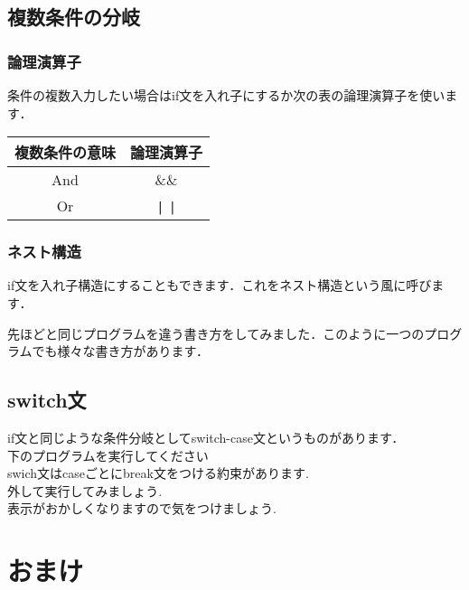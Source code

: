 \documentclass[a4j,titlepage,dvipdfmx]{jsarticle}   %
\begin{document}
\subsection{複数条件の分岐}
\subsubsection{論理演算子}
条件の複数入力したい場合はif文を入れ子にするか次の表の論理演算子を使います．
\begin{table}[htb]
\begin{tabular}{|c|c|}
\hline
複数条件の意味 & \multicolumn{1}{l|}{論理演算子} \\ \hline
And     & \&\&                            \\ \hline
Or      & \verb+|+	\verb+|+                          \\ \hline
\end{tabular}
\end{table}

\subsubsection{ネスト構造}
if文を入れ子構造にすることもできます．これをネスト構造という風に呼びます．

先ほどと同じプログラムを違う書き方をしてみました．このように一つのプログラムでも様々な書き方があります．\\
\subsection{switch文}
if文と同じような条件分岐としてswitch-case文というものがあります．\\
下のプログラムを実行してください\\

swich文はcaseごとにbreak文をつける約束があります.\\
外して実行してみましょう.\\
表示がおかしくなりますので気をつけましょう.\\
\section{おまけ}
\end{document}

